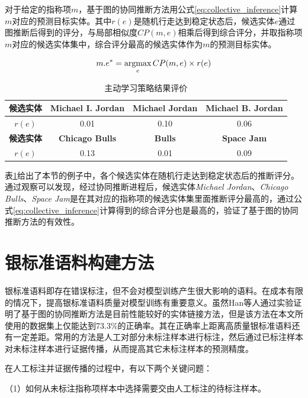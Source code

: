 对于给定的指称项$m$，基于图的协同推断方法用公式\ref{eq:collective_inference}计算$m$对应的预测目标实体。其中$r(e)$是随机行走达到稳定状态后，候选实体$e$通过图推断后得到的评分，与局部相似度$CP(m,e)$相乘后得到综合评分，并取指称项$m$对应的候选实体集中，综合评分最高的候选实体作为$m$的预测目标实体。

\begin{equation}\label{eq:collective_inference}
m.e^*=\operatorname*{argmax}_e CP(m,e)\times r(e)
\end{equation}

\begin{table}[!htb]
	\caption{主动学习策略结果评价\label{tab:el_graph_score}}
	\centering
	\begin{tabular}{|c|c|c|c|}
		\hline
		\textbf{候选实体} & \textbf{Michael I. Jordan} & \textbf{Michael Jordan} & \textbf{Michael B. Jordan}\\
		\hline
		$r(e)$ & 0.01 & 0.10 & 0.06\\
		\hline
		\textbf{候选实体} & \textbf{Chicago Bulls} & \textbf{Bulls} & \textbf{Space Jam}\\
		\hline
		$r(e)$ & 0.13 & 0.01 & 0.09\\
		\hline
	\end{tabular}
\end{table}

表\ref{tab:el_graph_score}给出了本节的例子中，各个候选实体在随机行走达到稳定状态后的推断评分。通过观察可以发现，经过协同推断进程后，候选实体\textit{Michael Jordan}、\textit{Chicago Bulls}、\textit{Space Jam}是在其对应的指称项的候选实体集里面推断评分最高的，通过公式\ref{eq:collective_inference}计算得到的综合评分也是最高的，验证了基于图的协同推断方法的有效性。

\section{银标准语料构建方法}
银标准语料即存在错误标注，但不会对模型训练产生很大影响的语料。在成本有限的情况下，提高银标准语料质量对模型训练有重要意义。虽然Han等人\cite{CELWTGBM}通过实验证明了基于图的协同推断方法是目前性能较好的实体链接方法，但是该方法在本文所使用的数据集上仅能达到73.3\%的正确率。其在正确率上距离高质量银标准语料还有一定差距。常用的方法是人工对部分未标注样本进行标注，然后通过已标注样本对未标注样本进行证据传播，从而提高其它未标注样本的预测精度。

在人工标注并证据传播的过程中，有以下两个关键问题：

（1）如何从未标注指称项样本中选择需要交由人工标注的待标注样本。


